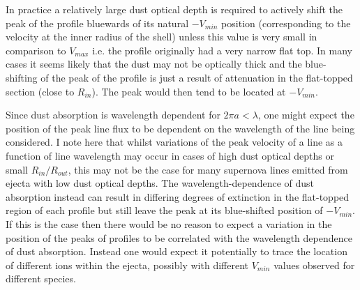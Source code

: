 In practice a relatively large dust optical depth is required to actively 
shift the peak of the profile bluewards of its natural $-V_{min}$ position 
(corresponding to the velocity at the inner radius of the shell) unless 
this value is very small in comparison to $V_{max}$ i.e. the profile 
originally had a very narrow flat top.  In many cases it seems likely that 
the dust may not be optically thick and the blue-shifting of the peak of 
the profile is just a result of attenuation in the flat-topped section (close 
to $R_{in}$).  The peak would then tend to be located at $-V_{min}$.

Since dust absorption is wavelength dependent for $2\pi a < \lambda$, one 
might expect the position of the peak line flux to be dependent on the 
wavelength of the line being considered.  I note here that whilst 
variations of the peak velocity of a line as a function of line wavelength 
may occur in cases of high dust optical depths or small $R_{in}/R_{out}$, 
this may not be the case for many supernova lines emitted from ejecta with 
low dust optical depths.  The wavelength-dependence of dust absorption 
instead can result in differing degrees of extinction in the flat-topped 
region of each profile but still leave the peak at its blue-shifted 
position of $-V_{min}$.  If this is the case then there would be no reason 
to expect a variation in the position of the peaks of profiles to be 
correlated with the wavelength dependence of dust absorption.  Instead one 
would expect it potentially to trace the location of different ions within 
the ejecta, possibly with different $V_{min}$ values observed for 
different species.

